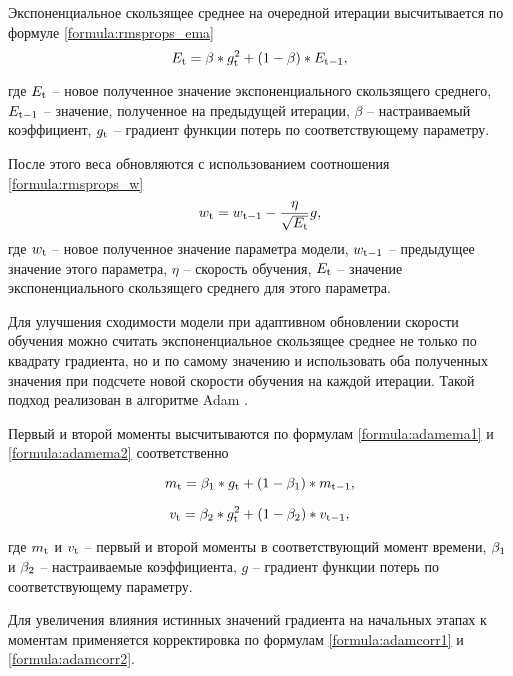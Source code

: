 Экспоненциальное скользящее среднее на очередной итерации высчитывается по формуле \ref{formula:rmsprops_ema}
\begin{equation}\label{formula:rmsprops_ema}
	E_{\rm{t}} = \beta * g_{\rm{t}}^2 + (1 - \beta) * E_{\rm{t-1}},
\end{equation}

где $E_{\rm{t}}$ -- новое полученное значение экспоненциального скользящего среднего, $E_{\rm{t-1}}$ -- значение, полученное на предыдущей итерации, $\beta$ -- настраиваемый коэффициент, $g_{\rm{t}}$ -- градиент функции потерь по соответствующему параметру.

После этого веса обновляются с использованием соотношения \ref{formula:rmsprops_w}
\begin{equation}\label{formula:rmsprops_w}
	w_{\rm{t}} = w_{\rm{t-1}} - \frac{\eta}{\sqrt{E_{\rm{t}}}}g,
\end{equation}
где $w_{\rm{t}}$ -- новое полученное значение параметра модели, $w_{\rm{t-1}}$ -- предыдущее значение этого параметра, $\eta$ -- скорость обучения, $E_{\rm{t}}$ -- значение экспоненциального скользящего среднего для этого параметра.

Для улучшения сходимости модели при адаптивном обновлении скорости обучения можно считать экспоненциальное скользящее среднее не только по квадрату градиента, но и по самому значению и использовать оба полученных значения при подсчете новой скорости обучения на каждой итерации. 
Такой подход реализован в алгоритме Adam \cite{zhang2024transformers}.

Первый и второй моменты высчитываются по формулам \ref{formula:adamema1} и \ref{formula:adamema2} соответственно

\begin{equation}\label{formula:adamema1}
	m_{\rm{t}} = \beta_{\rm{1}} * g_{\rm{t}} + (1 - \beta_{\rm{1}}) * m_{\rm{t-1}},
\end{equation}

\begin{equation}\label{formula:adamema2}
	v_{\rm{t}} = \beta_{\rm{2}} * g_{\rm{t}}^2 + (1 - \beta_{\rm{2}}) * v_{\rm{t-1}},
\end{equation}

где $m_{\rm{t}}$ и $v_{\rm{t}}$ -- первый и второй моменты в соответствующий момент времени, $\beta_{\rm{1}}$ и $\beta_{\rm{2}}$ -- настраиваемые коэффициента, $g$ -- градиент функции потерь по соответствующему параметру.

Для увеличения влияния истинных значений градиента на начальных этапах к моментам применяется корректировка по формулам \ref{formula:adamcorr1} и \ref{formula:adamcorr2}.

